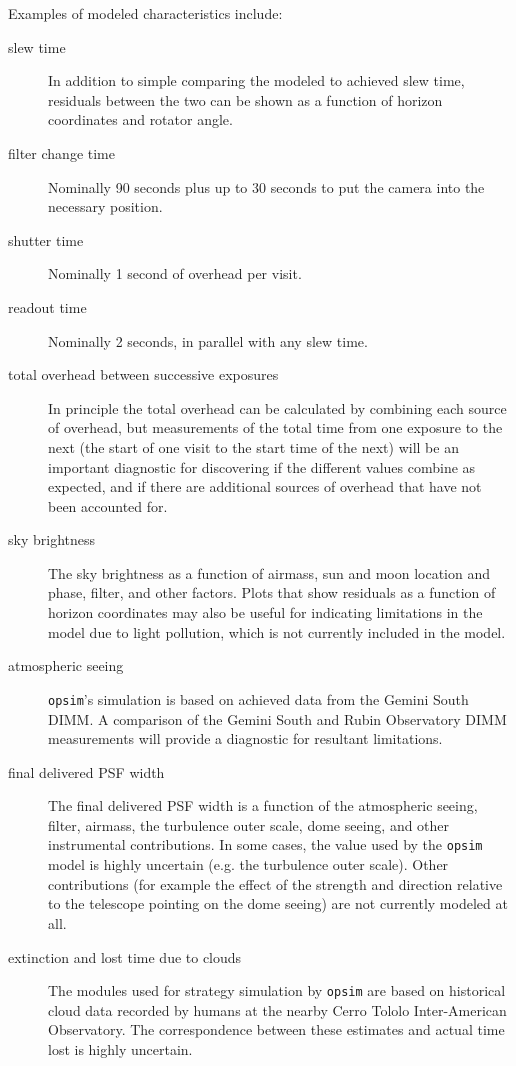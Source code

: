 Examples of modeled characteristics include:
\begin{description}
\item[{slew time}] In addition to simple comparing the modeled to achieved slew time, residuals between the two can be shown as a function of horizon coordinates and rotator angle.
\item[{filter change time}] Nominally 90 seconds plus up to 30 seconds to put the camera into the necessary position.
\item[{shutter time}] Nominally 1 second of overhead per visit.
\item[{readout time}] Nominally 2 seconds, in parallel with any slew time.
\item[{total overhead between successive exposures}] In principle the total overhead can be calculated by combining each source of overhead, but measurements of the total time from one exposure to the next (the start of one visit to the start time of the next) will be an important diagnostic for discovering if the different values combine as expected, and if there are additional sources of overhead that have not been accounted for.
\item[{sky brightness}] The sky brightness as a function of airmass, sun and moon location and phase, filter, and other factors. Plots that show residuals as a function of horizon coordinates may also be useful for indicating limitations in the model due to light pollution, which is not currently included in the model.
\item[{atmospheric seeing}] \texttt{opsim}'s simulation is based on achieved data from the Gemini South DIMM. A comparison of the Gemini South and Rubin Observatory DIMM measurements will provide a diagnostic for resultant limitations.
\item[{final delivered PSF width}] The final delivered PSF width is a function of the atmospheric seeing, filter, airmass, the turbulence outer scale, dome seeing, and other instrumental contributions. In some cases, the value used by the \texttt{opsim} model is highly uncertain (e.g. the turbulence outer scale). Other contributions (for example the effect of the strength and direction relative to the telescope pointing on the dome seeing) are not currently modeled at all.
\item[{extinction and lost time due to clouds}] The modules used for strategy simulation by \texttt{opsim} are based on historical cloud data recorded by humans at the nearby Cerro Tololo Inter-American Observatory. The correspondence between these estimates and actual time lost is highly uncertain.

\end{description}
